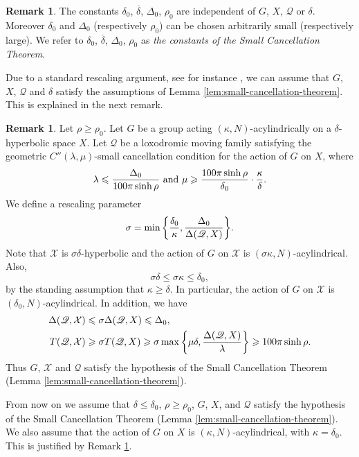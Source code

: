 \documentclass[leqno,a4paper,10pt]{amsart}
\theoremstyle{plain}
\theoremstyle{definition}
\newtheorem{rem}[thm]{Remark}
\theoremstyle{remark}
\newcommand{\q}[1]{\overline{#1}}
\newcommand{\scrQ}{\mathscr{Q}}
\let\le\leqslant
\let\ge\geqslant
\begin{document}
\begin{rem}
\label{rem:small-cancellation-theorem}
The constants $\delta_0$, $\q \delta$, $\Delta_0$, $\rho_0$ are independent of $G$, $X$, $\scrQ$ or $\delta$. Moreover $\delta_0$ and $\Delta_0$ (respectively $\rho_0$) can be chosen arbitrarily small (respectively large). We refer to $\delta_0$, $\q \delta$, $\Delta_0$, $\rho_0$ as \emph{the constants of the Small Cancellation Theorem}. 
\end{rem}
 Due to a standard rescaling argument, see for instance \cite{coulon_theorie_2016}, we can assume that $G$, $X$, $\scrQ$ and $\delta$ satisfy the assumptions of Lemma \ref{lem:small-cancellation-theorem}. This is explained in the next remark. 
\begin{rem}\label{R:rescaling}  Let $\rho \geqslant \rho_0$. 
Let $G$ be a group acting $(\kappa,N)$-acylindrically on a $\delta$-hyperbolic space $X$. Let $\scrQ$ be a loxodromic moving family satisfying the geometric $C''(\lambda,\mu)$-small cancellation condition for the action of $G$ on $X$, 
where 
$$\lambda\le \frac{\Delta_0}{100\pi\sinh\rho}\hbox{ and } \mu\ge \frac{100\pi \sinh \rho}{\delta_0}\cdot \frac{\kappa}{\delta}.$$ We define a rescaling parameter
$$\sigma=\min\qty{\frac{\delta_0}{\kappa},\frac{\Delta_0}{\Delta(\scrQ,X)}}.$$
Note that $\mathcal{X}$ is $\sigma\delta$-hyperbolic and the action of $G$ on $\mathcal{X}$ is $(\sigma\kappa,N)$-acylindrical. Also, 
$$\sigma\delta\le \sigma\kappa \le \delta_0,$$
by the standing assumption that $\kappa\ge \delta$. In particular, the action of $G$ on $\mathcal{X}$ is $(\delta_0,N)$-acylindrical. In addition, we have
\begin{align*}
	\Delta(\scrQ,\mathcal{X}) &\le \sigma \Delta(\scrQ,X) \le \Delta_0,\\ T(\scrQ,\mathcal{X}) &\ge \sigma T(\scrQ,X)\ge \sigma \max\qty { \mu\delta, \frac{\Delta(\scrQ,X)}{\lambda}} \ge 100\pi\sinh\rho.
\end{align*}
 Thus $G$, $\mathcal{X}$ and $\scrQ$ satisfy the hypothesis of the Small Cancellation Theorem (Lemma \ref{lem:small-cancellation-theorem}).
\end{rem}

From now on we assume that  $\delta\le \delta_0$, $\rho\geqslant \rho_0$, $G$, $X$, and $\scrQ$ satisfy the hypothesis of the Small Cancellation Theorem (Lemma \ref{lem:small-cancellation-theorem}). We also assume that the action of $G$ on $X$ is $(\kappa,N)$-acylindrical, with $\kappa = \delta_0$. This is justified by Remark \ref{R:rescaling}. 
\end{document}
